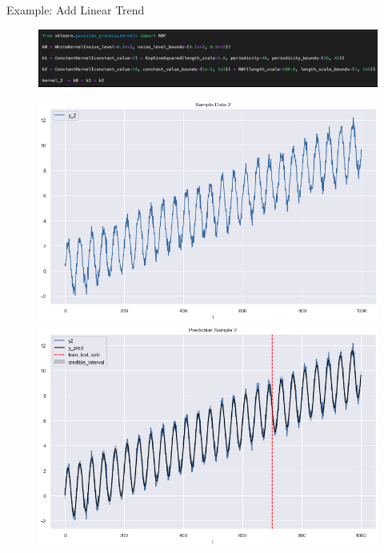 \documentclass[10pt]{beamer}
\begin{document}
\begin{frame}{Example: Add Linear Trend }
\begin{center}
\begin{figure}
\includegraphics[scale=0.3]{images/code_kernel_2_example3.png}
\end{figure}
\end{center}
\begin{center}
\begin{figure}
\includegraphics[scale=0.20]{images/sample_2_example3.png}
\includegraphics[scale=0.20]{images/pred_2_example3.png}
\end{figure}
\end{center}
\end{frame}
\end{document}
